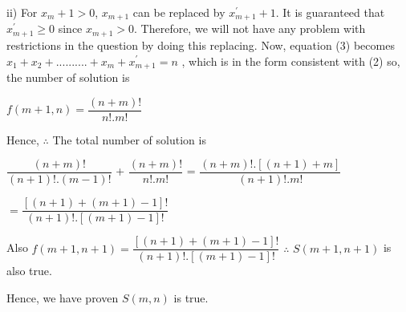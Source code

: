 \documentclass[11pt]{article}
\begin{document}
\newline \newline 
\noindent \newline  ii)  For $x_m+1 > 0$, $x_{m+1}$ can be replaced by $x_{m+1}^\prime + 1$. It is guaranteed that $x_{m+1}^\prime \geqslant 0$ since $x_{m+1} > 0$. Therefore, we will not have any problem with restrictions in the question by doing this replacing. \newline \newline
Now, equation (3) becomes \newline \newline
$x_1 + x_2 + .......... + x_m + x_{m+1}^\prime = n$ , which is in the form consistent with (2)\newline \newline
so, the number of solution is 
\begin{center}
    $f(m+1,n) = \dfrac{(n+m)!}{n!.m!}$
\end{center}
Hence, \newline \newline
$\therefore$ The total number of solution is \newline
\begin{center}
    $\dfrac{(n+m)!}{(n+1)!.(m-1)!}$ + $\dfrac{(n+m)!}{n!.m!}$ = $\dfrac{(n+m)!.[(n+1)+m]}{(n+1)!.m!}$
\end{center}
\begin{center}
    $= \dfrac{[(n+1)+(m+1)-1]!}{(n+1)!.[(m+1)-1]!}$
\end{center}
Also $f(m+1,n+1) = \dfrac{[(n+1) + (m+1) -1 ]!}{(n+1)!.[(m+1)-1]!}$\newline
$\therefore$ $S(m+1,n+1)$ is also true. \newline \newline

\noindent Hence, we have proven $S(m,n)$ is true.

\newpage
\end{document}
